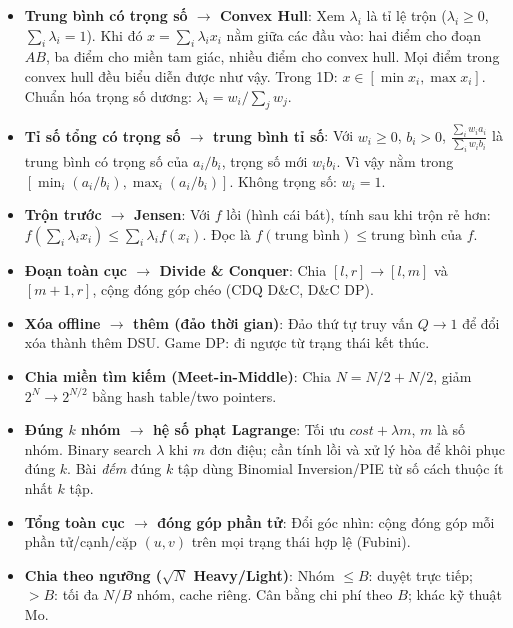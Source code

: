 \begin{itemize}
    \item \textbf{Trung bình có trọng số $\to$ Convex Hull}: Xem $\lambda_i$ là tỉ lệ trộn ($\lambda_i\ge0$, $\sum_i\lambda_i=1$). Khi đó $x=\sum_i\lambda_ix_i$ nằm giữa các đầu vào: hai điểm cho đoạn $AB$, ba điểm cho miền tam giác, nhiều điểm cho convex hull. Mọi điểm trong convex hull đều biểu diễn được như vậy. Trong 1D: $x\in[\min x_i,\max x_i]$. Chuẩn hóa trọng số dương: $\lambda_i=w_i/\sum_jw_j$.

    \item \textbf{Tỉ số tổng có trọng số $\to$ trung bình tỉ số}: Với $w_i\ge0$, $b_i>0$, $\frac{\sum_iw_ia_i}{\sum_iw_ib_i}$ là trung bình có trọng số của $a_i/b_i$, trọng số mới $w_ib_i$. Vì vậy nằm trong $[\min_i(a_i/b_i),\max_i(a_i/b_i)]$. Không trọng số: $w_i=1$.

    \item \textbf{Trộn trước $\to$ Jensen}: Với $f$ lồi (hình cái bát), tính sau khi trộn rẻ hơn: $f(\sum_i\lambda_ix_i)\le\sum_i\lambda_if(x_i)$. Đọc là $f(\text{trung bình})\le\text{trung bình của }f$.

    \item \textbf{Đoạn toàn cục $\to$ Divide \& Conquer}: Chia $[l,r]\to[l,m]$ và $[m+1,r]$, cộng đóng góp chéo (CDQ D\&C, D\&C DP).

    \item \textbf{Xóa offline $\to$ thêm (đảo thời gian)}: Đảo thứ tự truy vấn $Q\to1$ để đổi xóa thành thêm DSU. Game DP: đi ngược từ trạng thái kết thúc.

    \item \textbf{Chia miền tìm kiếm (Meet-in-Middle)}: Chia $N=N/2+N/2$, giảm $2^N\to2^{N/2}$ bằng hash table/two pointers.

    \item \textbf{Đúng $k$ nhóm $\to$ hệ số phạt Lagrange}: Tối ưu $cost+\lambda m$, $m$ là số nhóm. Binary search $\lambda$ khi $m$ đơn điệu; cần tính lồi và xử lý hòa để khôi phục đúng $k$. Bài \emph{đếm} đúng $k$ tập dùng Binomial Inversion/PIE từ số cách thuộc ít nhất $k$ tập.

    \item \textbf{Tổng toàn cục $\to$ đóng góp phần tử}: Đổi góc nhìn: cộng đóng góp mỗi phần tử/cạnh/cặp $(u,v)$ trên mọi trạng thái hợp lệ (Fubini).

    \item \textbf{Chia theo ngưỡng ($\sqrt N$ Heavy/Light)}: Nhóm $\le B$: duyệt trực tiếp; $>B$: tối đa $N/B$ nhóm, cache riêng. Cân bằng chi phí theo $B$; khác kỹ thuật Mo.


\end{itemize}
